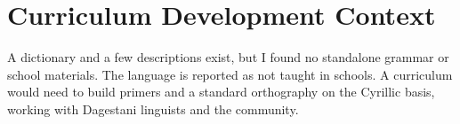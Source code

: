 \documentclass[12pt]{article}
\begin{document}
\section{Curriculum Development Context}
A dictionary and a few descriptions exist, but I found no standalone grammar or school materials. The language is reported as not taught in schools. A curriculum would need to build primers and a standard orthography on the Cyrillic basis, working with Dagestani linguists and the community.
\end{document}
